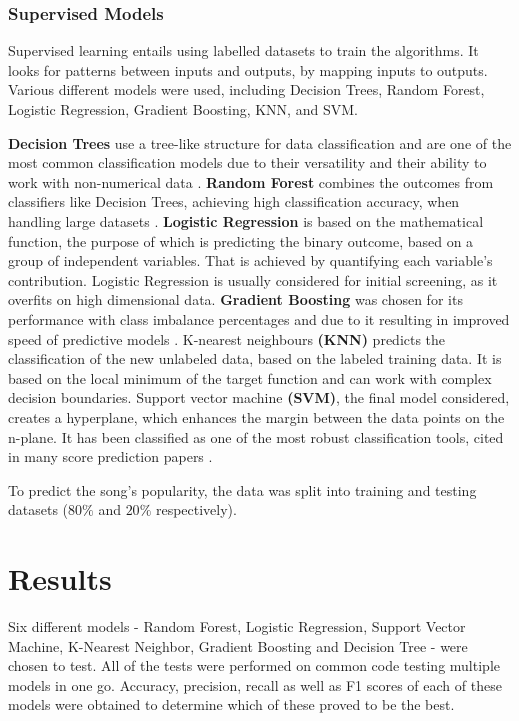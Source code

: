 \documentclass{article}
\begin{document}

\subsubsection{Supervised Models}
Supervised learning entails using labelled datasets to train the algorithms. It looks for patterns between inputs and outputs, by mapping inputs to outputs.
\cite{nasteski2017overview} Various different models were used, including Decision Trees, Random Forest, Logistic Regression, Gradient Boosting, KNN, and SVM. 

\textbf{Decision Trees} use a tree-like structure for data classification and are one of the most common classification models due to their versatility and their ability to work with non-numerical data \cite{priyam2013comparative}. \textbf{Random Forest} combines the outcomes from classifiers like Decision Trees, achieving high classification accuracy, when handling large datasets \cite{parmar2019review}. \textbf{Logistic Regression} is based on the mathematical function, the purpose of which is predicting the binary outcome, based on a group of independent variables. That is achieved by quantifying each variable's contribution. Logistic Regression is usually considered for initial screening, as it overfits on high dimensional data. \cite{stoltzfus2011logistic}  \textbf{Gradient Boosting} was chosen for its performance with class imbalance percentages and due to it resulting in improved speed of predictive models \cite{bentejac2021comparative}. K-nearest neighbours \textbf{(KNN)} predicts the classification of the new unlabeled data, based on the labeled training data. It is based on the local minimum of the target function and can work with complex decision boundaries. \cite{Hamilton2020} Support vector machine \textbf{(SVM)}, the final model considered, creates a hyperplane, which enhances the margin between the data points on the n-plane. It has been classified as one of the most robust classification tools, cited in many score prediction papers \cite{Yee2022}.

To predict the song's popularity, the data was split into training and testing datasets  (\( 80\% \) and \( 20\% \) respectively).

\section{Results}
Six different models - Random Forest, Logistic Regression, Support Vector Machine, K-Nearest Neighbor, Gradient Boosting and Decision Tree - were chosen to test. All of the tests were performed on common code testing multiple models in one go. Accuracy, precision, recall as well as F1 scores of each of these models were obtained to determine which of these proved to be the best.
\end{document}
